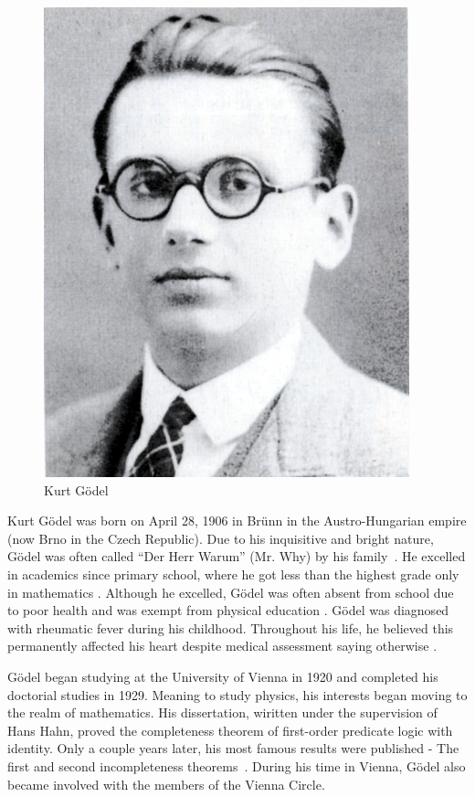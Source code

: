 \documentclass[../../../include/open-logic-section]{subfiles}
\begin{document}

\begin{figure}[h!] 
\centering
\includegraphics[scale=0.5]{kurt-godel.png} 
\caption{Kurt G{\"o}del} 
\end{figure}

Kurt G{\"o}del was born on April 28, 1906 in Br{\"u}nn in the
Austro-Hungarian empire (now Brno in the Czech Republic). Due to his
inquisitive and bright nature, G{\"o}del was often called ``Der Herr
Warum'' (Mr. Why) by his family~\citep[1]{Dawson1997}. He excelled in
academics since primary school, where he got less than the highest grade
only in mathematics \citep[15]{Dawson1997}. Although he excelled, G{\"o}del was
often absent from school due to poor health and was exempt from physical
education \citep[10]{Dawson1997}. G{\"o}del was diagnosed with rheumatic fever
during his childhood. Throughout his life, he believed this permanently
affected his heart despite medical assessment saying otherwise
\citep[11]{Dawson1997}.

G{\"o}del began studying at the University of Vienna in 1920 and completed his
doctorial studies in 1929. Meaning to study physics, his interests began
moving to the realm of mathematics. His dissertation,
wiritten under the supervision of Hans Hahn, proved the completeness
theorem of first-order predicate logic with identity. Only a couple years
later, his most famous results were published - The first and second
incompleteness theorems~\citep{Godel1931}. During his time in Vienna,
G{\"o}del also became involved with the members of the Vienna Circle.
\end{document}
